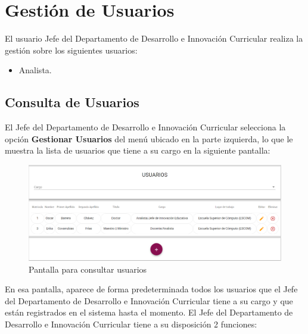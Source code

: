 \clearpage
\section{Gestión de Usuarios}

El usuario  Jefe del Departamento de Desarrollo e Innovación Curricular realiza la gestión sobre los siguientes usuarios:
\begin{itemize}
		\item Analista.
\end{itemize}
\subsection{Consulta de Usuarios}

El Jefe del Departamento de Desarrollo e Innovación Curricular selecciona  la opción \textbf{Gestionar Usuarios} del menú ubicado en la parte izquierda, lo que le muestra la lista de usuarios que tiene a su cargo en la siguiente pantalla:

\begin{figure}[H]
	\centering
	\hypertarget{consultarUs}{\includegraphics[width=0.6\linewidth]{images/SP5/Consultar-Usuario}}
	\caption{Pantalla para consultar usuarios}
	\label{consultarrh}
\end{figure}

En esa pantalla, aparece de forma predeterminada todos los usuarios que el Jefe del Departamento de Desarrollo e Innovación Curricular tiene a su cargo y que están registrados en el sistema hasta el momento. El Jefe del Departamento de Desarrollo e Innovación Curricular tiene a su disposición 2 funciones:

